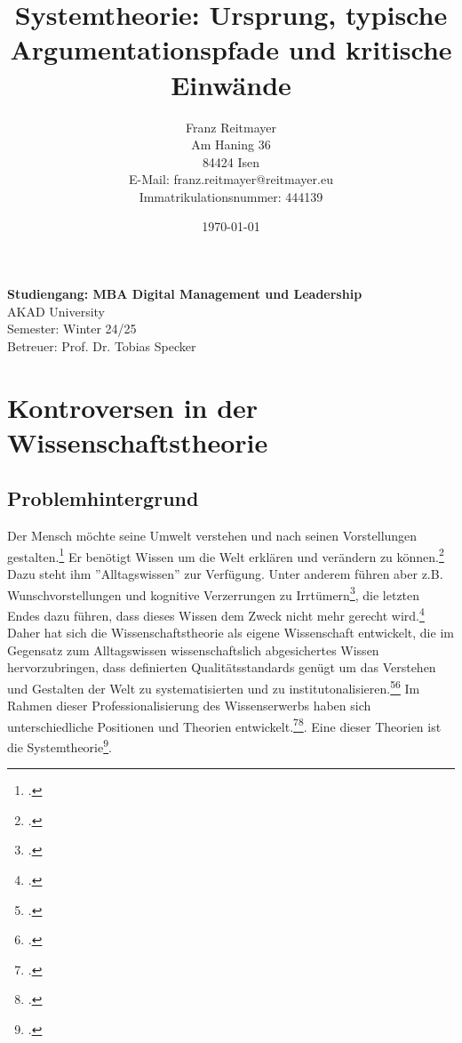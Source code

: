 \documentclass[a4paper,12pt]{article}
\title{Systemtheorie: Ursprung, typische Argumentationspfade und kritische Einwände}
\date{\today}
\begin{document}
\author{
    Franz Reitmayer \\
    Am Haning 36 \\
    84424 Isen \\
    E-Mail: franz.reitmayer@reitmayer.eu \\ 
    Immatrikulationsnummer: 444139
}

\maketitle
\vfill
\begin{center}
\textbf{Studiengang: MBA Digital Management und Leadership} \\
AKAD University \\
Semester: Winter 24/25 \\
Betreuer: Prof. Dr. Tobias Specker \\

\end{center}
\vfill
\newpage
\tableofcontents
\newpage



\section{Kontroversen in der Wissenschaftstheorie}
\subsection{Problemhintergrund}
Der Mensch möchte seine Umwelt verstehen und nach seinen Vorstellungen gestalten.\footcite[S. 4]{Helfrich2024} Er benötigt Wissen um die Welt erklären und verändern zu können.\footcite[Seite 1]{Helfrich2024} Dazu steht ihm ''Alltagswissen'' zur Verfügung. Unter anderem führen aber z.B. Wunschvorstellungen und kognitive Verzerrungen zu Irrtümern\footcite[S. 8]{Helfrich2024}, die letzten Endes dazu führen, dass dieses Wissen dem Zweck nicht mehr gerecht wird.\footcite[Seite 9]{Helfrich2024} Daher hat sich die Wissenschaftstheorie als eigene Wissenschaft entwickelt, die im Gegensatz zum Alltagswissen wissenschaftslich abgesichertes Wissen hervorzubringen, dass definierten Qualitätsstandards genügt um das Verstehen und Gestalten der Welt zu systematisierten und zu institutonalisieren.\footcite[Seite 4]{Kornmeier2007}\footcite[S. 3]{Helfrich2024} Im Rahmen dieser Professionalisierung des Wissenserwerbs haben sich unterschiedliche Positionen und Theorien entwickelt.\footcite[S. 19 ff]{Kornmesser2020}\footcite[S. 93]{Helfrich2024}. Eine dieser Theorien ist die Systemtheorie\footcite[S. 107]{Helfrich2024}.
\end{document}
